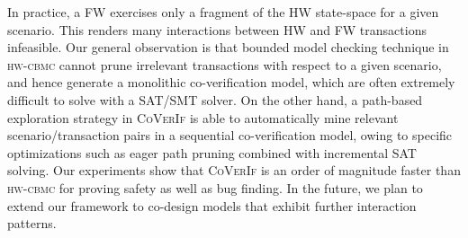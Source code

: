 \documentclass[sigconf]{acmart}
\newcommand{\tool}[1]{\textsc{#1}\xspace}
\newcommand{\hwcbmcv}{\tool{hw-cbmc}}
\newcommand{\verifox}{\tool{CoVerIf}}
\begin{document}
In practice, a FW exercises only a fragment of the HW state-space for a given scenario.  
This renders many interactions between HW and FW transactions infeasible.   
Our general observation is that bounded model checking technique in \hwcbmcv 
cannot prune irrelevant transactions with respect to a given scenario, 
and hence generate a monolithic co-verification model, which are often 
extremely difficult to solve with a SAT/SMT solver. On the other hand, 
a path-based exploration strategy in \verifox is able to automatically 
mine relevant scenario/transaction pairs in a sequential co-verification 
model, owing to specific optimizations such as eager path pruning
combined with incremental SAT solving.  Our experiments show that \verifox 
is an order of magnitude faster than \hwcbmcv for proving safety as well as 
bug finding.  In the future, we plan to extend our framework to co-design 
models that exhibit further interaction patterns.

%

 
\end{document}
